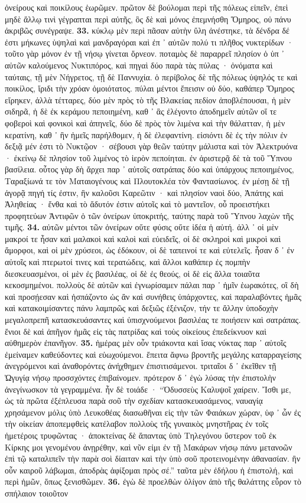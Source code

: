 \documentclass[a4paper, 11pt, oneside, polutonikogreek, german]{article}
\begin{document}
ὀνείρους καὶ ποικίλους ἑωρῶμεν. πρῶτον δὲ βούλομαι περὶ τῆς πόλεως εἰπεῖν, ἐπεὶ μηδὲ ἄλλῳ τινὶ γέγραπται περὶ αὐτῆς, ὃς δὲ καὶ μόνος ἐπεμνήσθη Ὅμηρος, οὐ πάνυ ἀκριβῶς συνέγραψε. \textbf{33.} κύκλῳ μὲν περὶ πᾶσαν αὐτὴν ὕλη ἀνέστηκε, τὰ δένδρα δέ ἐστι μήκωνες ὑψηλαὶ καὶ μανδραγόραι καὶ ἐπ ᾽ αὐτῶν πολύ τι πλῆθος νυκτερίδων · τοῦτο γὰρ μόνον ἐν τῇ νήσῳ γίνεται ὄρνεον. ποταμὸς δὲ παραρρεῖ πλησίον ὁ ὑπ ᾽ αὐτῶν καλούμενος Νυκτιπόρος, καὶ πηγαὶ δύο παρὰ τὰς πύλας · ὀνόματα καὶ ταύταις, τῇ μὲν Νήγρετος, τῇ δὲ Παννυχία. ὁ περίβολος δὲ τῆς πόλεως ὑψηλός τε καὶ ποικίλος, ἴριδι τὴν χρόαν ὁμοιότατος. πύλαι μέντοι ἔπεισιν οὐ δύο, καθάπερ Ὅμηρος εἴρηκεν, ἀλλὰ τέτταρες, δύο μὲν πρὸς τὸ τῆς Βλακείας πεδίον ἀποβλέπουσαι, ἡ μὲν σιδηρᾶ, ἡ δὲ ἐκ κεράμου πεποιημένη, καθ ᾽ ἃς ἐλέγοντο ἀποδημεῖν αὐτῶν οἵ τε φοβεροὶ καὶ φονικοὶ καὶ ἀπηνεῖς, δύο δὲ πρὸς τὸν λιμένα καὶ τὴν θάλατταν, ἡ μὲν κερατίνη, καθ ᾽ ἣν ἡμεῖς παρήλθομεν, ἡ δὲ ἐλεφαντίνη. εἰσιόντι δὲ ἐς τὴν πόλιν ἐν δεξιᾷ μέν ἐστι τὸ Νυκτῷον · σέβουσι γὰρ θεῶν ταύτην μάλιστα καὶ τὸν Ἀλεκτρυόνα · ἐκείνῳ δὲ πλησίον τοῦ λιμένος τὸ ἱερὸν πεποίηται. ἐν ἀριστερᾷ δὲ τὰ τοῦ Ὕπνου βασίλεια. οὗτος γὰρ δὴ ἄρχει παρ ᾽ αὐτοῖς σατράπας δύο καὶ ὑπάρχους πεποιημένος, Ταραξίωνά τε τὸν Ματαιογένους καὶ Πλουτοκλέα τὸν Φαντασίωνος. ἐν μέσῃ δὲ τῇ ἀγορᾷ πηγή τίς ἐστιν, ἣν καλοῦσι Καρεῶτιν · καὶ πλησίον ναοὶ δύο, Ἀπάτης καὶ Ἀληθείας · ἔνθα καὶ τὸ ἄδυτόν ἐστιν αὐτοῖς καὶ τὸ μαντεῖον, οὗ προειστήκει προφητεύων Ἀντιφῶν ὁ τῶν ὀνείρων ὑποκριτής, ταύτης παρὰ τοῦ Ὕπνου λαχὼν τῆς τιμῆς. \textbf{34.} αὐτῶν μέντοι τῶν ὀνείρων οὔτε φύσις οὔτε ἰδέα ἡ αὐτή. ἀλλ ᾽ οἱ μὲν μακροί τε ἦσαν καὶ μαλακοὶ καὶ καλοὶ καὶ εὐειδεῖς, οἱ δὲ σκληροὶ καὶ μικροὶ καὶ ἄμορφοι, καὶ οἱ μὲν χρύσεοι, ὡς ἐδόκουν, οἱ δὲ ταπεινοί τε καὶ εὐτελεῖς. ἦσαν δ ᾽ ἐν αὐτοῖς καὶ πτερωτοί τινες καὶ τερατώδεις, καὶ ἄλλοι καθάπερ ἐς πομπὴν διεσκευασμένοι, οἱ μὲν ἐς βασιλέας, οἱ δὲ ἐς θεούς, οἱ δὲ εἰς ἄλλα τοιαῦτα κεκοσμημένοι. πολλοὺς δὲ αὐτῶν καὶ ἐγνωρίσαμεν πάλαι παρ ᾽ ἡμῖν ἑωρακότες, οἳ δὴ καὶ προσῄεσαν καὶ ἠσπάζοντο ὡς ἂν καὶ συνήθεις ὑπάρχοντες, καὶ παραλαβόντες ἡμᾶς καὶ κατακοιμίσαντες πάνυ λαμπρῶς καὶ δεξιῶς ἐξένιζον, τήν τε ἄλλην ὑποδοχὴν μεγαλοπρεπῆ κατασκευάσαντες καὶ ὑπισχνούμενοι βασιλέας τε ποιήσειν καὶ σατράπας. ἔνιοι δὲ καὶ ἀπῆγον ἡμᾶς εἰς τὰς πατρίδας καὶ τοὺς οἰκείους ἐπεδείκνυον καὶ αὐθημερὸν ἐπανῆγον. \textbf{35.} ἡμέρας μὲν οὖν τριάκοντα καὶ ἴσας νύκτας παρ ᾽ αὐτοῖς ἐμείναμεν καθεύδοντες καὶ εὐωχούμενοι. ἔπειτα ἄφνω βροντῆς μεγάλης καταρραγείσης ἀνεγρόμενοι καὶ ἀναθορόντες ἀνήχθημεν ἐπισιτισάμενοι. τριταῖοι δ ᾽ ἐκεῖθεν τῇ Ὠγυγίᾳ νήσῳ προσσχόντες ἐπιβαίνομεν. πρότερον δ ᾽ ἐγὼ λύσας τὴν ἐπιστολὴν ἀνεγίνωσκον τὰ γεγραμμένα. ἦν δὲ τοιάδε · "`Ὀδυσσεὺς Καλυψοῖ χαίρειν. Ἴσθι με, ὡς τὰ πρῶτα ἐξέπλευσα παρὰ σοῦ τὴν σχεδίαν κατασκευασάμενος, ναυαγίᾳ χρησάμενον μόλις ὑπὸ Λευκοθέας διασωθῆναι εἰς τὴν τῶν Φαιάκων χώραν, ὑφ ᾽ ὧν ἐς τὴν οἰκείαν ἀποπεμφθεὶς κατέλαβον πολλοὺς τῆς γυναικὸς μνηστῆρας ἐν τοῖς ἡμετέροις τρυφῶντας · ἀποκτείνας δὲ ἅπαντας ὑπὸ Τηλεγόνου ὕστερον τοῦ ἐκ Κίρκης μοι γενομένου ἀνῃρέθην, καὶ νῦν εἰμι ἐν τῇ Μακάρων νήσῳ πάνυ μετανοῶν ἐπὶ τῷ καταλιπεῖν τὴν παρὰ σοὶ δίαιταν καὶ τὴν ὑπὸ σοῦ προτεινομένην ἀθανασίαν. ἢν οὖν καιροῦ λάβωμαι, ἀποδρὰς ἀφίξομαι πρὸς σέ."' ταῦτα μὲν ἐδήλου ἡ ἐπιστολή, καὶ περὶ ἡμῶν, ὅπως ξενισθῶμεν. \textbf{36.} ἐγὼ δὲ προελθὼν ὀλίγον ἀπὸ τῆς θαλάττης εὗρον τὸ σπήλαιον τοιοῦτον 
\end{document}
